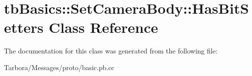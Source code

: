 \hypertarget{classtbBasics_1_1SetCameraBody_1_1HasBitSetters}{}\section{tb\+Basics\+:\+:Set\+Camera\+Body\+:\+:Has\+Bit\+Setters Class Reference}
\label{classtbBasics_1_1SetCameraBody_1_1HasBitSetters}


The documentation for this class was generated from the following file\+:\begin{DoxyCompactItemize}
\item 
Tarbora/\+Messages/proto/basic.\+pb.\+cc\end{DoxyCompactItemize}
